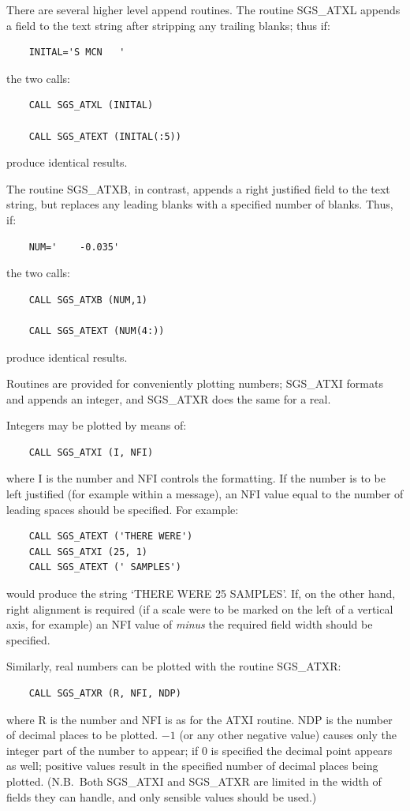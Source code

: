 \documentclass[11pt]{article}
\newcommand{\htmlref}[2]{#1}
\begin{document}
There are several higher level append routines.
The routine \htmlref{SGS\_ATXL}{SGS_ATXL}
appends a field to the text string after stripping any trailing
blanks;  thus if:
\begin{verbatim}
    INITAL='S MCN   '
\end{verbatim}
the two calls:
\begin{verbatim}
    CALL SGS_ATXL (INITAL)

    CALL SGS_ATEXT (INITAL(:5))
\end{verbatim}
produce identical results.

The routine
\htmlref{SGS\_ATXB}{SGS_ATXB}, in contrast, appends a right justified
field to the text string, but replaces any leading blanks with a
specified number of blanks.  Thus, if:
\begin{verbatim}
    NUM='    -0.035'
\end{verbatim}
the two calls:
\begin{verbatim}
    CALL SGS_ATXB (NUM,1)

    CALL SGS_ATEXT (NUM(4:))
\end{verbatim}
produce identical results.

Routines are provided for conveniently plotting numbers;
\htmlref{SGS\_ATXI}{SGS_ATXI}
formats and appends an integer, and
\htmlref{SGS\_ATXR}{SGS_ATXR} does the same for a
real.

Integers may be plotted by means of:
\begin{verbatim}
    CALL SGS_ATXI (I, NFI)
\end{verbatim}
where I is the number and NFI controls the formatting.  If the number
is to be left justified (for example within a message), an NFI value
equal to the number of leading spaces should be specified.  For
example:
\begin{verbatim}
    CALL SGS_ATEXT ('THERE WERE')
    CALL SGS_ATXI (25, 1)
    CALL SGS_ATEXT (' SAMPLES')
\end{verbatim}
would produce the string `THERE WERE 25 SAMPLES'.  If, on
the other hand, right alignment is required (if a
scale were to be marked
on the left of a vertical axis, for example) an NFI value of {\em minus}\/
the required field width should be specified.

Similarly, real numbers can be plotted with the routine SGS\_ATXR:
\begin{verbatim}
    CALL SGS_ATXR (R, NFI, NDP)
\end{verbatim}
where R is the number and NFI is as for the ATXI routine.  NDP is
the number of decimal places to be plotted.  $-1$ (or any other negative
value) causes only the integer part of the number to appear;  if 0 is
specified the decimal point appears as well;  positive values result
in the specified number of decimal places being plotted.
(N.B.\ Both SGS\_ATXI and SGS\_ATXR are limited in the width of fields they
can handle, and only sensible values should be used.)
\end{document}
